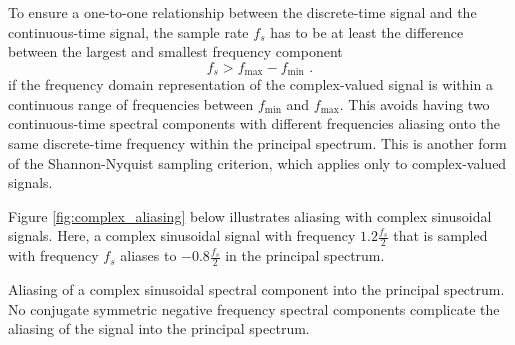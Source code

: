 To ensure a one-to-one relationship between the discrete-time signal and the 
continuous-time signal, the sample rate $f_s$ has to be at least the difference 
between the largest and smallest frequency component
\begin{equation}
  \boxed{
  f_s > f_{\mathrm{max}}-f_{\mathrm{min}}
  }\,\,.
\end{equation}
if the frequency domain representation of the complex-valued signal is within a 
continuous range of frequencies between $f_{\mathrm{min}}$ and $f_{\mathrm{max}}$. 
This avoids having two continuous-time spectral components with different frequencies 
aliasing onto the same discrete-time frequency within the principal 
spectrum.
This is another form of the Shannon-Nyquist sampling criterion, 
which applies only to complex-valued signals.

Figure \ref{fig:complex_aliasing} below illustrates aliasing with complex sinusoidal signals. 
Here, a complex sinusoidal signal with frequency $1.2\frac{f_s}{2}$ that is sampled with 
frequency $f_s$ aliases to $-0.8\frac{f_s}{2}$ in the principal spectrum.

\begin{marginfigure}
  \begin{center}
  \end{center}
  \caption{Aliasing of a complex sinusoidal spectral component into the principal spectrum. No conjugate symmetric negative frequency spectral components complicate the aliasing of the signal into the principal spectrum.}
  \label{fig:complex_aliasing}
\end{marginfigure}

